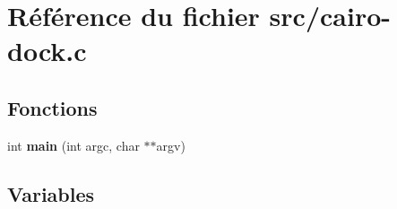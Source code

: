 \section{R\'{e}f\'{e}rence du fichier src/cairo-dock.c}
\label{cairo-dock_8c}
\subsection*{Fonctions}
\begin{CompactItemize}
\item 
int {\bf main} (int argc, char $\ast$$\ast$argv)
\end{CompactItemize}
\subsection*{Variables}
